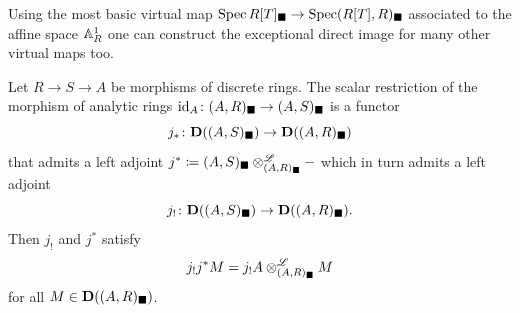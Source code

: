 Using the most basic virtual map $\operatorname{Spec} R[T]_\blacksquare \to \operatorname{Spec} (R[T], R)_\blacksquare$ associated to the affine space ${\mathbb{A}}_R^1$ one can construct the exceptional direct image for many other virtual maps too.
\begin{proposition}
	\label{proposition: lower shriek for virtual maps}
	
	Let $R\to S\to A$ be morphisms of discrete rings. The scalar restriction of the morphism of analytic rings $\mathrm{id}_A\colon (A, R)_\blacksquare\to (A, S)_\blacksquare$ is a functor
	$$j_\ast\colon {{\mathbf{D}}((A, S)_\blacksquare)} \to {{\mathbf{D}}((A, R)_\blacksquare)}$$
	that admits a left adjoint $j^\ast \coloneqq (A, S)_\blacksquare \otimes^{\mathscr{L}}_{(A, R)_\blacksquare}  -$ which in turn admits a left adjoint
	$$j_!\colon{{\mathbf{D}}((A, S)_\blacksquare)} \to {{\mathbf{D}}((A, R)_\blacksquare)}.$$
	Then $j_!$ and $j^\ast$ satisfy
	$$j_!j^\ast M = j_! A  \otimes^{\mathscr{L}}_{(A, R)_\blacksquare} M$$
	for all $M\in {{\mathbf{D}}((A, R)_\blacksquare)}$.
\end{proposition}
